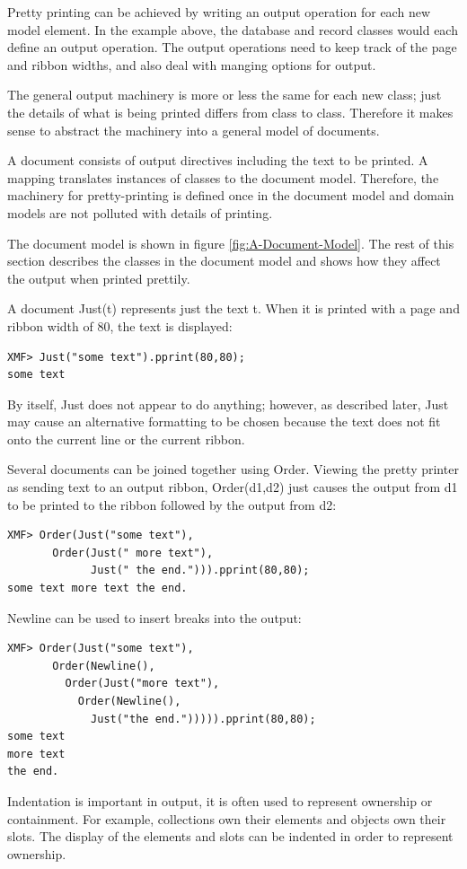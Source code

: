 Pretty printing can be achieved by writing an output operation for
each new model element. In the example above, the database and record
classes would each define an output operation. The output operations
need to keep track of the page and ribbon widths, and also deal with
manging options for output. 

The general output machinery is more or less the same for each new
class; just the details of what is being printed differs from class
to class. Therefore it makes sense to abstract the machinery into
a general model of documents. 

A document consists of output directives including the text to be
printed. A mapping translates instances of classes to the document
model. Therefore, the machinery for pretty-printing is defined once
in the document model and domain models are not polluted with details
of printing.

The document model is shown in figure \ref{fig:A-Document-Model}.
The rest of this section describes the classes in the document model
and shows how they affect the output when printed prettily.

A document Just(t) represents just the text t. When it is printed
with a page and ribbon width of 80, the text is displayed:

\begin{lstlisting}
XMF> Just("some text").pprint(80,80);
some text
\end{lstlisting}By itself, Just does not appear to do anything; however, as described
later, Just may cause an alternative formatting to be chosen because
the text does not fit onto the current line or the current ribbon.

Several documents can be joined together using Order. Viewing the
pretty printer as sending text to an output ribbon, Order(d1,d2) just
causes the output from d1 to be printed to the ribbon followed by
the output from d2:

\begin{lstlisting}
XMF> Order(Just("some text"),
       Order(Just(" more text"),
             Just(" the end."))).pprint(80,80);
some text more text the end.
\end{lstlisting}Newline can be used to insert breaks into the output:

\begin{lstlisting}
XMF> Order(Just("some text"),
       Order(Newline(),
         Order(Just("more text"),
           Order(Newline(),
             Just("the end."))))).pprint(80,80);
some text
more text
the end.
\end{lstlisting}Indentation is important in output, it is often used to represent
ownership or containment. For example, collections own their elements
and objects own their slots. The display of the elements and slots
can be indented in order to represent ownership.


